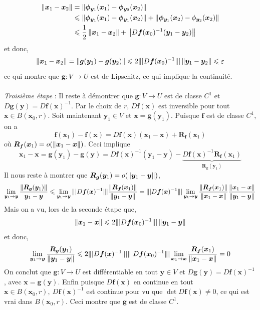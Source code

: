 {	\begin{align*}
		\left\| \bm x_1 - \bm x_2 \right\| &= \left\| \bm \phi_{\bm y_1}(\bm x_1) - \bm \phi_{\bm y_2} (\bm x_2) \right\| \\
		& \leqslant \left\| \bm \phi_{\bm y_1} (\bm x_1) - \bm \phi_{\bm y_1} (\bm x_2) \right\| + \left\| \bm \phi_{\bm y_1} (\bm x_2) - \phi_{\bm y_2} (\bm x_2) \right\| \\
		&\leqslant \frac{1}{2} \left\| \bm x_1 - \bm x_2 \right\| + \left\| D \bm f(\bm x_0)^{-1}(\bm y_1 - \bm y_2) \right\|
	\end{align*}
	et donc,
	\[
	\left\| \bm x_1 - \bm x_2 \right\| = \left\| \bm g (\bm y_1) - \bm g(\bm y_2) \right\| \leqslant 2 \|| D \bm f(\bm x_0)^{-1} \|| \left\| \bm y_1 - \bm y_2 \right\| \leqslant \varepsilon
	\]
	ce qui montre que $\bm g : V \to U$ est de Lipschitz, ce qui implique la continuité.
	\\\\
	\textit{Troisième étape} : Il reste à démontrer que $\bm g : V \to U$ est de classe $C^1$ et $D \bm g(\bm y) = D \bm f(\bm x)^{-1}$. Par le choix de $r$, $D \bm f(\bm x)$ est inversible pour tout $\bm x \in B(\bm x_0, r)$. Soit maintenant $\bm y_1 \in V$ et $\bm x = \bm g(\bm y_1)$. Puisque $\bm f$ est de classe $C^1$, on a
	\[
	\bm f(\bm x_1) - \bm f(\bm x) = D \bm f(\bm x) (\bm x_1 - \bm x) + \bm R_{\bm f}(\bm x_1)
	\]
	où $\bm R_{\bm f} (\bm x_1) = o(\left\| \bm x_1 - \bm x \right\|)$. Ceci implique
	\[
	\bm x_1 - \bm x = \bm g(\bm y_1) - \bm g(\bm y) = D\bm f(\bm x)^{-1}(\bm y_1 - \bm y) - \underbrace{D \bm f(\bm x)^{-1} \bm R_{\bm f}(\bm x_1)}_{\bm R_{\bm g}(\bm y_1)}
	\]
	Il nous reste à montrer que $\bm R_{\bm g}(\bm y_1) = o(\left\| \bm y_1 - \bm y \right\|)$,
	\[
	\lim_{\bm y_1 \to \bm y} \frac{\left\| \bm R_{\bm g}(\bm y_1) \right\|}{\bm y_1 - \bm y} \leqslant \lim_{\bm y_1 \to \bm y} \|| D \bm f(\bm x)^{-1} \|| \frac{\left\| \bm R_{\bm f}(\bm x_1) \right\|}{\left\| \bm y_1 - \bm y \right\|} = \|| D \bm f(\bm x)^{-1} \|| \lim_{\bm y_1 \to \bm y} \frac{\left\| \bm R_{\bm f}(\bm x_1) \right\|}{\left\| \bm x_1 - \bm x \right\|} \frac{\left\| \bm x_1 - \bm x \right\|}{\left\| \bm y_1 - \bm y \right\|}
	\]
	Mais on a vu, lors de la seconde étape que,
	\[
	\left\| \bm x_1 - \bm x \right\| \leqslant 2 \|| D \bm f(\bm x_0)^{-1} \|| \left\| \bm y_1 - \bm y \right\|
	\]
	et donc,
	\[
	\lim_{\bm y_1 \to \bm y} \frac{\bm R_{\bm g}(\bm y_1)}{\left\| \bm y_1 - \bm y \right\|} \leqslant 2 \|| D \bm f(\bm x)^{-1} \|| \|| D \bm f(\bm x_0)^{-1} \||  \lim_{\bm x_1 \to \bm x} \frac{\bm R_{\bm f}(\bm x_1)}{\left\| \bm x_1 - \bm x \right\|} = 0
	\]
	On conclut que $\bm g : V \to U$ est différentiable en tout $\bm y \in V$ et $D \bm g(\bm y) = D \bm f(\bm x)^{-1}$, avec $\bm x = \bm g(\bm y)$. Enfin puisque $D \bm f(\bm x)$ en continue en tout $\bm x \in B(\bm x_0, r), ~ D \bm f(\bm x)^{-1}$ est continue pour vu que $\det D \bm f(\bm x) \neq 0$, ce qui est vrai dans $B(\bm x_0, r)$. Ceci montre que $\bm g$ est de classe $C^1$.
}

